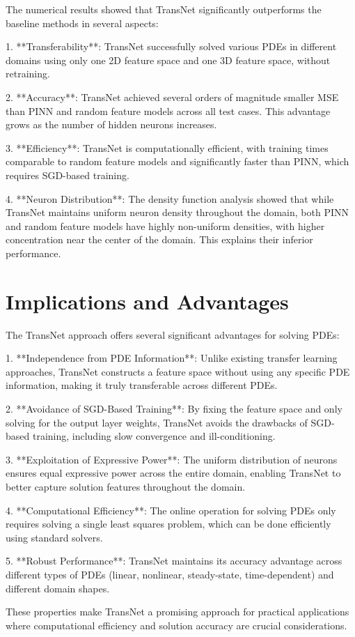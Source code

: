 \documentclass[11pt]{article}
\begin{document}
The numerical results showed that TransNet significantly outperforms the baseline methods in several aspects:

1. **Transferability**: TransNet successfully solved various PDEs in different domains using only one 2D feature space and one 3D feature space, without retraining.

2. **Accuracy**: TransNet achieved several orders of magnitude smaller MSE than PINN and random feature models across all test cases. This advantage grows as the number of hidden neurons increases.

3. **Efficiency**: TransNet is computationally efficient, with training times comparable to random feature models and significantly faster than PINN, which requires SGD-based training.

4. **Neuron Distribution**: The density function analysis showed that while TransNet maintains uniform neuron density throughout the domain, both PINN and random feature models have highly non-uniform densities, with higher concentration near the center of the domain. This explains their inferior performance.

\section{Implications and Advantages}

The TransNet approach offers several significant advantages for solving PDEs:

1. **Independence from PDE Information**: Unlike existing transfer learning approaches, TransNet constructs a feature space without using any specific PDE information, making it truly transferable across different PDEs.

2. **Avoidance of SGD-Based Training**: By fixing the feature space and only solving for the output layer weights, TransNet avoids the drawbacks of SGD-based training, including slow convergence and ill-conditioning.

3. **Exploitation of Expressive Power**: The uniform distribution of neurons ensures equal expressive power across the entire domain, enabling TransNet to better capture solution features throughout the domain.

4. **Computational Efficiency**: The online operation for solving PDEs only requires solving a single least squares problem, which can be done efficiently using standard solvers.

5. **Robust Performance**: TransNet maintains its accuracy advantage across different types of PDEs (linear, nonlinear, steady-state, time-dependent) and different domain shapes.

These properties make TransNet a promising approach for practical applications where computational efficiency and solution accuracy are crucial considerations.
\end{document}
